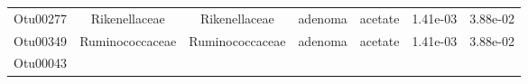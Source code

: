 \documentclass[11pt,]{article}
\begin{document}
\begin{longtable}[]{@{}ccccccc@{}}
\begin{minipage}[t]{0.09\columnwidth}\centering\strut
Otu00277\strut
\end{minipage} & \begin{minipage}[t]{0.17\columnwidth}\centering\strut
Rikenellaceae\strut
\end{minipage} & \begin{minipage}[t]{0.17\columnwidth}\centering\strut
Rikenellaceae\strut
\end{minipage} & \begin{minipage}[t]{0.09\columnwidth}\centering\strut
adenoma\strut
\end{minipage} & \begin{minipage}[t]{0.11\columnwidth}\centering\strut
acetate\strut
\end{minipage} & \begin{minipage}[t]{0.09\columnwidth}\centering\strut
1.41e-03\strut
\end{minipage} & \begin{minipage}[t]{0.09\columnwidth}\centering\strut
3.88e-02\strut
\end{minipage}\tabularnewline
\begin{minipage}[t]{0.09\columnwidth}\centering\strut
Otu00349\strut
\end{minipage} & \begin{minipage}[t]{0.17\columnwidth}\centering\strut
Ruminococcaceae\strut
\end{minipage} & \begin{minipage}[t]{0.17\columnwidth}\centering\strut
Ruminococcaceae\strut
\end{minipage} & \begin{minipage}[t]{0.09\columnwidth}\centering\strut
adenoma\strut
\end{minipage} & \begin{minipage}[t]{0.11\columnwidth}\centering\strut
acetate\strut
\end{minipage} & \begin{minipage}[t]{0.09\columnwidth}\centering\strut
1.41e-03\strut
\end{minipage} & \begin{minipage}[t]{0.09\columnwidth}\centering\strut
3.88e-02\strut
\end{minipage}\tabularnewline
\begin{minipage}[t]{0.09\columnwidth}\centering\strut
Otu00043\strut
\end{minipage} & \begin{minipage}[t]{0.17\columnwidth}\centering\strut

\end{minipage}
\end{longtable}
\end{document}
